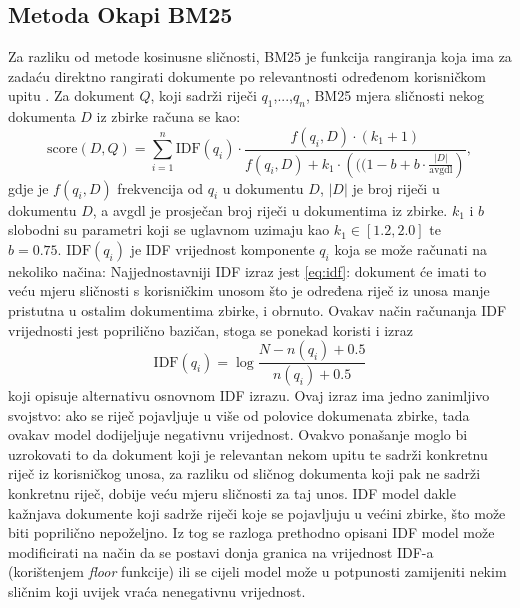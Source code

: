 \documentclass[times, utf8, zavrsni, numeric]{fer}
\begin{document}
\subsection{Metoda Okapi BM25}
Za razliku od metode kosinusne sličnosti, BM25 je funkcija rangiranja koja ima za zadaću direktno rangirati dokumente po relevantnosti određenom korisničkom upitu \cite{schutze2008introduction}. Za dokument $Q$, koji sadrži riječi $q_{1}$,...,$q_{n}$, BM25 mjera sličnosti nekog dokumenta $D$ iz zbirke računa se kao:
\begin{equation}
{\displaystyle {\text{score}}(D,Q)=\sum _{i=1}^{n}{\text{IDF}}(q_{i})\cdot {\frac {f(q_{i},D)\cdot (k_{1}+1)}{f(q_{i},D)+k_{1}\cdot \left(((1-b+b\cdot {\frac {|D|}{\text{avgdl}}}\right)}},}
\end{equation}
gdje je ${\displaystyle f(q_{i},D)}$	 frekvencija od ${\displaystyle q_{i}}$ u dokumentu $D$, ${\displaystyle |D|}$ je broj riječi u dokumentu $D$, a avgdl je prosječan broj riječi u dokumentima iz zbirke. ${\displaystyle k_{1}}$ i $b$ slobodni su parametri koji se uglavnom uzimaju kao ${\displaystyle k_{1}\in [1.2,2.0]}$ te ${\displaystyle b=0.75}.{\displaystyle {\text{ IDF}}(q_{i})}$ je IDF vrijednost komponente ${\displaystyle q_{i}}$ koja se može računati na nekoliko načina:
Najjednostavniji IDF izraz jest \ref{eq:idf}: dokument će imati to veću mjeru sličnosti s korisničkim unosom što je određena riječ iz unosa manje pristutna u ostalim dokumentima zbirke, i obrnuto. Ovakav način računanja IDF vrijednosti jest poprilično bazičan, stoga se ponekad koristi i izraz
\begin{equation}
\text{IDF}(q_i) = \log \frac{N - n(q_i) + 0.5}{n(q_i) + 0.5}
\label{idf2}
\end{equation}
koji opisuje alternativu osnovnom IDF izrazu. Ovaj izraz ima jedno zanimljivo svojstvo: ako se riječ pojavljuje u više od polovice dokumenata zbirke, tada ovakav model dodijeljuje negativnu vrijednost. Ovakvo ponašanje moglo bi uzrokovati to da dokument koji je relevantan nekom upitu te sadrži konkretnu riječ iz korisničkog unosa, za razliku od sličnog dokumenta koji pak ne sadrži konkretnu riječ, dobije veću mjeru sličnosti za taj unos. IDF model dakle kažnjava dokumente koji sadrže riječi koje se pojavljuju u većini zbirke, što može biti poprilično nepoželjno. Iz tog se razloga prethodno opisani IDF model može modificirati na način da se postavi donja granica na vrijednost IDF-a (korištenjem \textit{floor} funkcije) ili se cijeli model može u potpunosti zamijeniti nekim sličnim koji uvijek vraća nenegativnu vrijednost.
\end{document}
